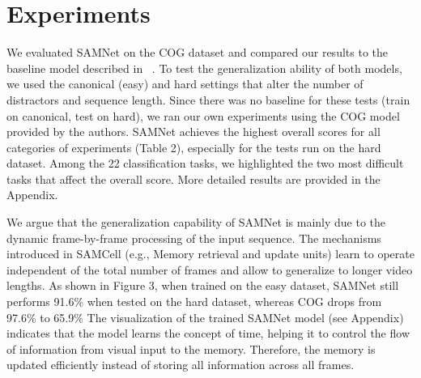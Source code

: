 \section{Experiments}

We evaluated SAMNet on the COG dataset and compared our results to the baseline model described in ~\cite{yang2018dataset}. To test the generalization ability of both models, we used the canonical (easy) and hard settings that alter the number of distractors and sequence length.  Since there was no baseline for these tests (train on canonical, test on hard), we ran our own experiments using the COG model provided by the authors.  SAMNet achieves the highest overall scores for all categories of experiments (Table 2), especially for the tests run on the hard dataset.  Among the 22 classification tasks, we highlighted the two most difficult tasks that affect the overall score.  More detailed results are provided in the Appendix.

We argue that the generalization capability of SAMNet is mainly due to the dynamic frame-by-frame processing of the input sequence.  The mechanisms introduced in SAMCell (e.g., Memory retrieval and update units) learn to operate independent of the total number of frames and allow to generalize to longer video lengths. As shown in Figure 3, when trained on the easy dataset, SAMNet still performs 91.6\% when tested on the hard dataset, whereas COG drops from 97.6\% to 65.9\%   The visualization of the trained SAMNet model (see Appendix) indicates that the model learns the concept of time, helping it to control the flow of information from visual input to the memory.  Therefore, the memory is updated efficiently instead of storing all information across all frames.



